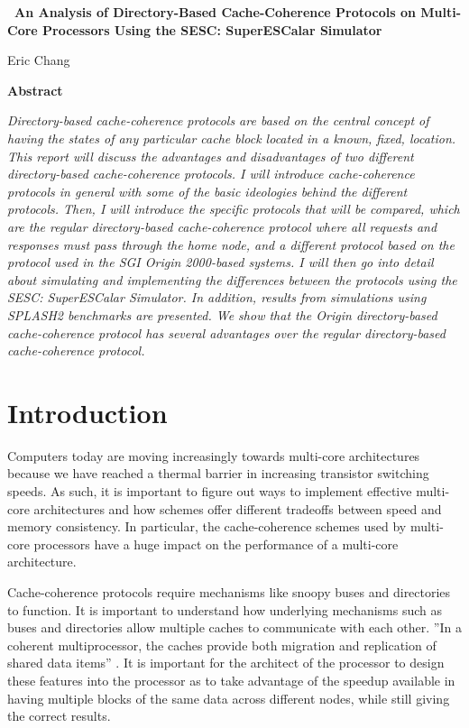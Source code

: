 \documentclass[letterpaper]{article}
\title{}
\begin{document}
{\centering\bfseries
\ An Analysis of Directory-Based Cache-Coherence Protocols on Multi-Core Processors Using the SESC: SuperESCalar Simulator
\par}


\bigskip

{\centering
Eric Chang
\par}

\bigskip

{\bfseries
Abstract}

\textit{Directory-based cache-coherence protocols are based on the central concept of having the states of any particular cache block located in a known, fixed, location. This report will discuss the advantages and disadvantages of two different directory-based cache-coherence protocols. I will introduce cache-coherence protocols in general with some of the basic ideologies behind the different protocols. Then, I will introduce the specific protocols that will be compared, which are the regular directory-based cache-coherence protocol where all requests and responses must pass through the home node, and a different protocol based on the protocol used in the SGI Origin 2000-based systems. I will then go into detail about simulating and implementing the differences between the protocols using the SESC: SuperESCalar Simulator. In addition, results from simulations using SPLASH2 benchmarks are presented. We show that the Origin directory-based cache-coherence protocol has several advantages over the regular directory-based cache-coherence protocol.}

\section[Introduction]{\rmfamily Introduction}
Computers today are moving increasingly towards multi-core architectures because we have reached a thermal barrier in increasing transistor switching speeds. As such, it is important to figure out ways to implement effective multi-core architectures and how schemes offer different tradeoffs between speed and memory consistency. In particular, the cache-coherence schemes used by multi-core processors have a huge impact on the performance of a multi-core architecture.

Cache-coherence protocols require mechanisms like snoopy buses and directories to function. It is important to understand how underlying mechanisms such as buses and directories allow multiple caches to communicate with each other. ''In a coherent multiprocessor, the caches provide both migration and replication of shared data items'' \cite{HEN00}. It is important for the architect of the processor to design these features into the processor as to take advantage of the speedup available in having multiple blocks of the same data across different nodes, while still giving the correct results.
\end{document}
